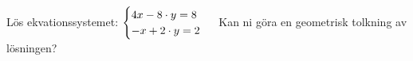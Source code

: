 Lös ekvationssystemet: 
\begin{math}
	\begin{cases}
	4x - 8 \cdot y = 8 \\
	-x + 2 \cdot y = 2 \\
	\end{cases}
	\\
	\\
\end{math}
Kan ni göra en geometrisk tolkning av lösningen?